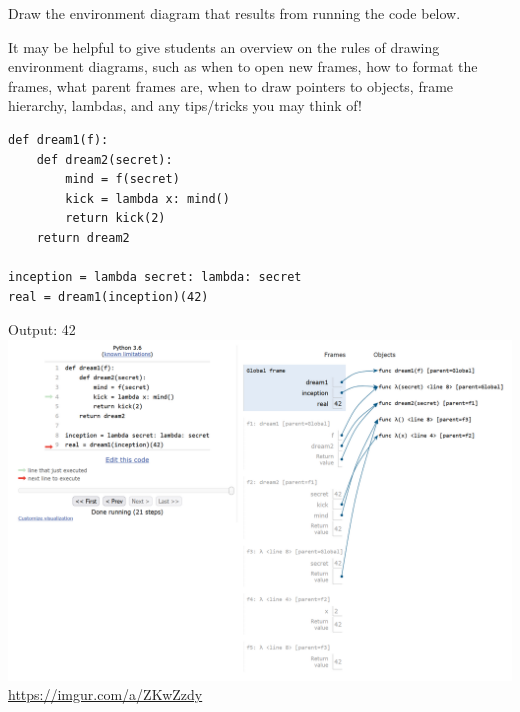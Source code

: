 \begin{blocksection}
\question Draw the environment diagram that results from running the code below.

\begin{questionmeta}
    It may be helpful to give students an overview on the rules of drawing environment diagrams, such as when to open new frames, how to format the frames, what parent frames are, when to draw pointers to objects, frame hierarchy, lambdas, and any tips/tricks you may think of!
\end{questionmeta}

\begin{lstlisting}
def dream1(f):
    def dream2(secret):
        mind = f(secret)
        kick = lambda x: mind()
        return kick(2)
    return dream2

inception = lambda secret: lambda: secret
real = dream1(inception)(42)
\end{lstlisting}

\pagebreak

\begin{solution}[2in]
Output: 42 \newline
\includegraphics[scale=0.5]{newNewInception.png}
\newline
\url{https://imgur.com/a/ZKwZzdy}
\end{solution}
\end{blocksection}
